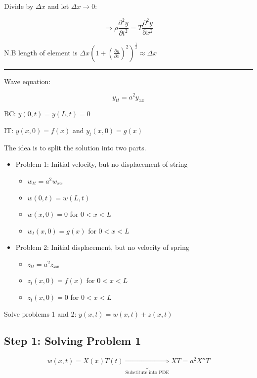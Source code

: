 \documentclass{article}
\begin{document}
Divide by $\Delta x$ and let $\Delta x \to 0$:

$$\Rightarrow \rho \frac{\partial^2 y}{\partial t^2} = T \frac{\partial^2 y}{\partial x^2}$$

N.B length of element is $\Delta x (1 + (\frac{\partial y}{\partial x})^2 )^{\frac{1}{2}} \approx \Delta x$

\hfill

\hrule

\hfill

Wave equation: 

$$y_{tt} = a^2 y_{xx}$$

\begin{center}
    BC: $y(0,t) = y(L,t) = 0$
    
    IT: $y(x,0) = f(x)$ and $y_t(x,0) = g(x)$
\end{center}



The idea is to split the solution into two parts. 


\begin{itemize}
    \item Problem 1: Initial velocity, but no displacement of string
    \begin{itemize}
        \item $w_{tt} = a^2 w_{xx}$
        \item $w(0,t) = w(L,t)$
        \item $w(x,0) = 0$ for $0 < x < L$
        \item $w_t(x,0) = g(x)$ for $0 < x < L$
    \end{itemize}
    \item Problem 2: Initial displacement, but no velocity of spring
    \begin{itemize}
        \item $z_{tt} = a^2 z_{xx}$
        \item $z_t (x,0) = f(x)$ for $0 < x < L$
        \item $z_t(x,0) = 0$ for $0 < x < L$
    \end{itemize}
\end{itemize}

Solve problems 1 and 2: $y(x,t) = w(x,t) + z(x,t)$

\subsection{Step 1: Solving Problem 1}

$$w(x,t) = X(x) T(t) \underbrace{\Rightarrow}_{\text{Substitute into PDE}} X \ddot{T} = a^2 X'' T$$
\end{document}

